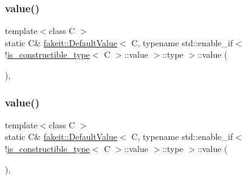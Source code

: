 \subsubsection{\texorpdfstring{value()}{value()}\hspace{0.1cm}{\footnotesize\ttfamily [5/9]}}
{\footnotesize\ttfamily template$<$class C $>$ \\
static C\& \mbox{\hyperlink{structfakeit_1_1DefaultValue}{fakeit\+::\+Default\+Value}}$<$ C, typename std\+::enable\+\_\+if$<$!\mbox{\hyperlink{structfakeit_1_1is__constructible__type}{is\+\_\+constructible\+\_\+type}}$<$ C $>$\+::value $>$\+::type $>$\+::value (\begin{DoxyParamCaption}{ }\end{DoxyParamCaption})\hspace{0.3cm}{\ttfamily [inline]}, {\ttfamily [static]}}

\mbox{\label{structfakeit_1_1DefaultValue_3_01C_00_01typename_01std_1_1enable__if_3_9is__constructible__type_237d75e2cfb810085e1504a1340d5949_ace6890104d79eccdf278ceb3b8d1d887}} 
\subsubsection{\texorpdfstring{value()}{value()}\hspace{0.1cm}{\footnotesize\ttfamily [6/9]}}
{\footnotesize\ttfamily template$<$class C $>$ \\
static C\& \mbox{\hyperlink{structfakeit_1_1DefaultValue}{fakeit\+::\+Default\+Value}}$<$ C, typename std\+::enable\+\_\+if$<$!\mbox{\hyperlink{structfakeit_1_1is__constructible__type}{is\+\_\+constructible\+\_\+type}}$<$ C $>$\+::value $>$\+::type $>$\+::value (\begin{DoxyParamCaption}{ }\end{DoxyParamCaption})\hspace{0.3cm}{\ttfamily [inline]}, {\ttfamily [static]}}

